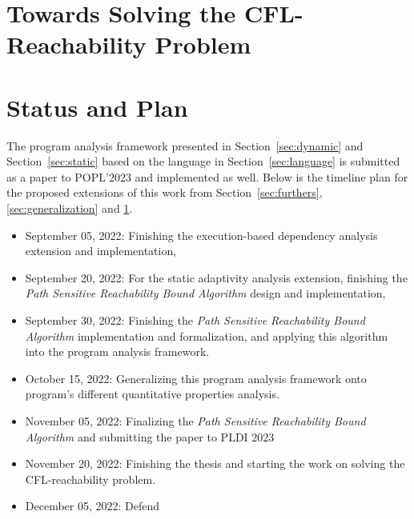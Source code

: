 \documentclass[a4paper,11pt]{article}
\begin{document}
\section{Towards Solving the CFL-Reachability Problem}
\label{sec:cfl_reduction}


\section{Status and Plan}
The program analysis framework presented in Section~\ref{sec:dynamic} and Section~\ref{sec:static} 
based on the language in Section~\ref{sec:language}
 is submitted as a paper to POPL'2023 and implemented as well. 
 Below is the timeline plan for the proposed extensions of this work
 from Section~\ref{sec:furthers}, \ref{sec:generalization} and \ref{sec:cfl_reduction}.
\begin{itemize}
\item September 05, 2022: Finishing the execution-based dependency analysis extension and implementation,
\item September 20, 2022: For the static adaptivity analysis extension, 
finishing the \emph{Path Sensitive Reachability Bound Algorithm} design and implementation, 
\item September 30, 2022: Finishing the \emph{Path Sensitive Reachability Bound Algorithm} implementation and formalization, 
and applying this algorithm into the program analysis framework.
\item October 15, 2022:  Generalizing this program analysis framework onto program's different quantitative properties analysis.
\item November 05, 2022: Finalizing the \emph{Path Sensitive Reachability Bound Algorithm} and submitting the paper to PLDI 2023
\item November 20, 2022: Finishing the thesis and starting the work on solving the CFL-reachability problem.
\item December 05, 2022: Defend
\end{itemize}




\end{document}
